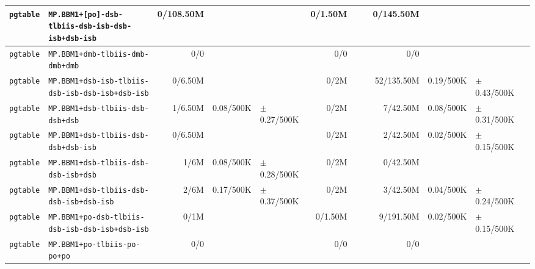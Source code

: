\begin{tabular}{l l  | r r l | r r l | r r l l}
        \verb|pgtable| &      \verb|MP.BBM1+[po]-dsb-tlbiis-dsb-isb-dsb-isb+dsb-isb| &      0/108.50M &                       &                   &        0/1.50M &                       &                   &      0/145.50M &                       &                    & \\ \hline 
        \verb|pgtable| &                       \verb|MP.BBM1+dmb-tlbiis-dmb-dmb+dmb| &            0/0 &                       &                   &            0/0 &                       &                   &            0/0 &                       &                    & \\ \hline 
        \verb|pgtable| &       \verb|MP.BBM1+dsb-isb-tlbiis-dsb-isb-dsb-isb+dsb-isb| &        0/6.50M &                       &                   &           0/2M &                       &                   &     52/135.50M &             0.19/500K &    $\pm$ 0.43/500K & \\ \hline 
        \verb|pgtable| &                       \verb|MP.BBM1+dsb-tlbiis-dsb-dsb+dsb| &        1/6.50M &             0.08/500K &   $\pm$ 0.27/500K &           0/2M &                       &                   &       7/42.50M &             0.08/500K &    $\pm$ 0.31/500K & \\ \hline 
        \verb|pgtable| &                   \verb|MP.BBM1+dsb-tlbiis-dsb-dsb+dsb-isb| &        0/6.50M &                       &                   &           0/2M &                       &                   &       2/42.50M &             0.02/500K &    $\pm$ 0.15/500K & \\ \hline 
        \verb|pgtable| &                   \verb|MP.BBM1+dsb-tlbiis-dsb-dsb-isb+dsb| &           1/6M &             0.08/500K &   $\pm$ 0.28/500K &           0/2M &                       &                   &       0/42.50M &                       &                    & \\ \hline 
        \verb|pgtable| &               \verb|MP.BBM1+dsb-tlbiis-dsb-dsb-isb+dsb-isb| &           2/6M &             0.17/500K &   $\pm$ 0.37/500K &           0/2M &                       &                   &       3/42.50M &             0.04/500K &    $\pm$ 0.24/500K & \\ \hline 
        \verb|pgtable| &        \verb|MP.BBM1+po-dsb-tlbiis-dsb-isb-dsb-isb+dsb-isb| &           0/1M &                       &                   &        0/1.50M &                       &                   &      9/191.50M &             0.02/500K &    $\pm$ 0.15/500K & \\ \hline 
        \verb|pgtable| &                           \verb|MP.BBM1+po-tlbiis-po-po+po| &            0/0 &                       &                   &            0/0 &                       &                   &            0/0 &                       &                    & \\ \hline 

\end{tabular}
